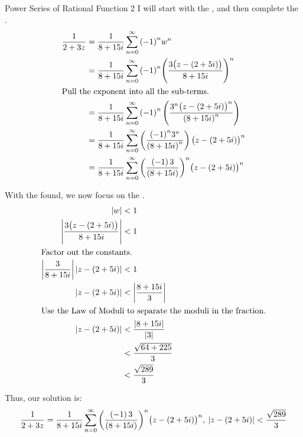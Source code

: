 \begin{example}{Power Series of Rational Function 2}
  I will start with the , and then complete the .
  \begin{align*}
    \frac{1}{2 + 3z} &= \frac{1}{8+15i} \sum_{n=0}^{\infty} {(-1)}^{n} w^{n} \\
                     &= \frac{1}{8+15i} \sum_{n=0}^{\infty} {(-1)}^{n} {\left( \frac{3 \bigl( z - (2+5i) \bigr)}{8+15i} \right)}^{n} \\
    \shortintertext{Pull the exponent into all the sub-terms.}
                     &= \frac{1}{8+15i} \sum_{n=0}^{\infty} {(-1)}^{n} \left( \frac{3^{n} {\bigl( z - (2+5i) \bigr)}^{n}}{{(8+15i)}^{n}} \right) \\
                     &= \frac{1}{8+15i} \sum_{n=0}^{\infty} \left( \frac{{(-1)}^{n} 3^{n} }{{(8+15i)}^{n}} \right) {\bigl( z - (2+5i) \bigr)}^{n} \\
                     &= \frac{1}{8+15i} \sum_{n=0}^{\infty} {\left( \frac{(-1)\, 3}{(8+15i)} \right)}^{n} {\bigl( z - (2+5i) \bigr)}^{n} \\
  \end{align*}

  With the  found, we now focus on the .
  \begin{align*}
    \left\lvert w \right\rvert &< 1 \\
    \left\lvert \frac{3 \bigl( z - (2+5i) \bigr)}{8+15i} \right\rvert &< 1 \\
    \shortintertext{Factor out the constants.}
    \left\lvert \frac{3}{8+15i} \right\rvert \left\lvert z - (2+5i) \right\rvert &< 1 \\
    \left\lvert z - (2+5i) \right\rvert &< \left\lvert \frac{8+15i}{3} \right\rvert \\
    \shortintertext{Use the Law of Moduli to separate the moduli in the fraction.}
    \left\lvert z - (2+5i) \right\rvert &< \frac{\left\lvert 8+15i \right\rvert}{\left\lvert 3 \right\rvert} \\
                &< \frac{\sqrt{64 + 225}}{3} \\
    &< \frac{\sqrt{289}}{3}
  \end{align*}

  Thus, our solution is:
  \begin{equation*}
    \frac{1}{2 + 3z} = \frac{1}{8+15i} \sum_{n=0}^{\infty} {\left( \frac{(-1)\, 3}{(8+15i)} \right)}^{n} {\bigl( z - (2+5i) \bigr)}^{n} , \: \left\lvert z - (2+5i) \right\rvert < \frac{\sqrt{289}}{3}
  \end{equation*}
\end{example}


